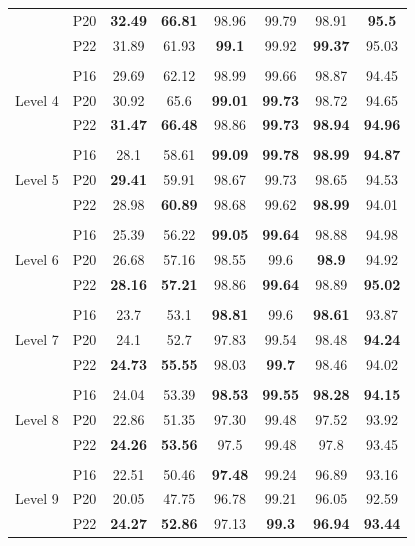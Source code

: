 \documentclass[a4paper,12pt]{article}
\begin{document}
\begin{table}[H]
{\begin{tabular}{|c|c|c|c|c|c|c|c|}
			& P20 & \textbf{32.49} & \textbf{66.81} & 98.96 & 99.79 & 98.91 & \textbf{95.5} \\ \cline{2-8} 
			& P22 & 31.89 & 61.93 & \textbf{99.1} & 99.92 & \textbf{99.37} & 95.03 \\ \hline
			\multicolumn{8}{|c|}{} \\ \hline
			\multirow{3}{*}{Level 4} & P16 & 29.69 & 62.12 & 98.99 & 99.66 & 98.87 & 94.45 \\ \cline{2-8} 
			& P20 & 30.92 & 65.6 & \textbf{99.01} & \textbf{99.73} & 98.72 & 94.65 \\ \cline{2-8} 
			& P22 & \textbf{31.47} & \textbf{66.48} & 98.86 & \textbf{99.73} & \textbf{98.94} & \textbf{94.96} \\ \hline
			\multicolumn{8}{|c|}{} \\ \hline
			\multirow{3}{*}{Level 5} & P16 & 28.1 & 58.61 & \textbf{99.09} & \textbf{99.78} & \textbf{98.99} & \textbf{94.87} \\ \cline{2-8} 
			& P20 & \textbf{29.41} & 59.91 & 98.67 & 99.73 & 98.65 & 94.53 \\ \cline{2-8} 
			& P22 & 28.98 & \textbf{60.89} & 98.68 & 99.62 & \textbf{98.99} & 94.01 \\ \hline
			\multicolumn{8}{|c|}{} \\ \hline
			\multirow{3}{*}{Level 6} & P16 & 25.39 & 56.22 & \textbf{99.05} & \textbf{99.64} & 98.88 & 94.98 \\ \cline{2-8} 
			& P20 & 26.68 & 57.16 & 98.55 & 99.6 & \textbf{98.9} & 94.92 \\ \cline{2-8} 
			& P22 & \textbf{28.16} & \textbf{57.21} & 98.86 & \textbf{99.64} & 98.89 & \textbf{95.02} \\ \hline
			\multicolumn{8}{|c|}{} \\ \hline
			\multirow{3}{*}{Level 7} & P16 & 23.7 & 53.1 & \textbf{98.81} & 99.6 & \textbf{98.61} & 93.87 \\ \cline{2-8} 
			& P20 & 24.1 & 52.7 & 97.83 & 99.54 & 98.48 & \textbf{94.24} \\ \cline{2-8} 
			& P22 & \textbf{24.73} & \textbf{55.55} & 98.03 & \textbf{99.7} & 98.46 & 94.02 \\ \hline
			\multicolumn{8}{|c|}{} \\ \hline
			\multirow{3}{*}{Level 8} & P16 & 24.04 & 53.39 & \textbf{98.53} & \textbf{99.55} & \textbf{98.28} & \textbf{94.15} \\ \cline{2-8} 
			& P20 & 22.86 & 51.35 & 97.30 & 99.48 & 97.52 & 93.92 \\ \cline{2-8} 
			& P22 & \textbf{24.26} & \textbf{53.56} & 97.5 & 99.48 & 97.8 & 93.45 \\ \hline
			\multicolumn{8}{|c|}{} \\ \hline
			\multirow{3}{*}{Level 9} & P16 & 22.51 & 50.46 & \textbf{97.48} & 99.24 & 96.89 & 93.16 \\ \cline{2-8} 
			& P20 & 20.05 & 47.75 & 96.78 & 99.21 & 96.05 & 92.59 \\ \cline{2-8} 
			& P22 & \textbf{24.27} & \textbf{52.86} & 97.13 & \textbf{99.3} & \textbf{96.94} & \textbf{93.44} \\ \hline
		\end{tabular}%
	}
\end{table}
\end{document}
